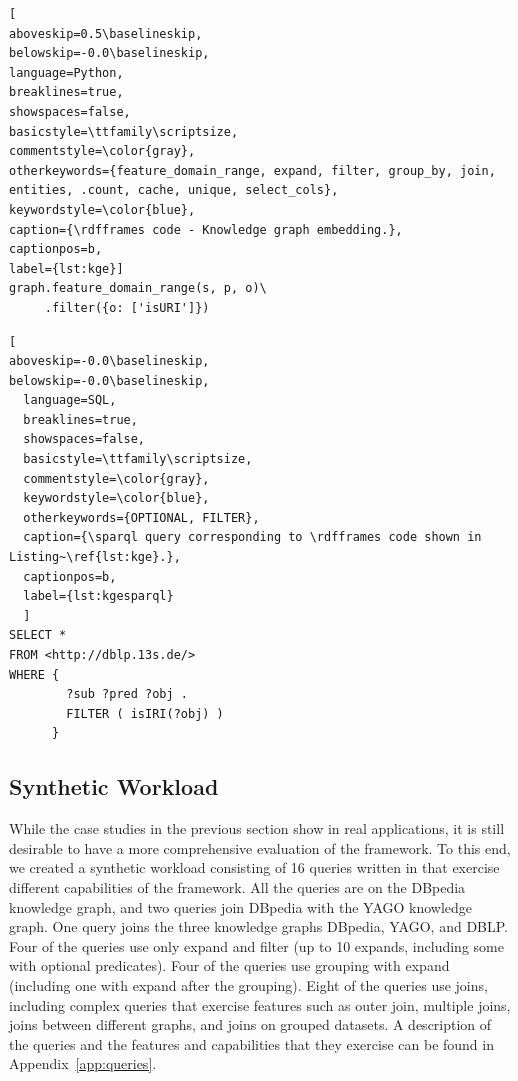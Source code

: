 \begin{lstlisting}[
aboveskip=0.5\baselineskip,
belowskip=-0.0\baselineskip,
language=Python,
breaklines=true,
showspaces=false,
basicstyle=\ttfamily\scriptsize,
commentstyle=\color{gray},
otherkeywords={feature_domain_range, expand, filter, group_by, join, entities, .count, cache, unique, select_cols},
keywordstyle=\color{blue},
caption={\rdfframes code - Knowledge graph embedding.},
captionpos=b,
label={lst:kge}]
graph.feature_domain_range(s, p, o)\
     .filter({o: ['isURI']})
\end{lstlisting}

\begin{lstlisting}[
aboveskip=-0.0\baselineskip,
belowskip=-0.0\baselineskip,
  language=SQL,
  breaklines=true,
  showspaces=false,
  basicstyle=\ttfamily\scriptsize,
  commentstyle=\color{gray},
  keywordstyle=\color{blue},
  otherkeywords={OPTIONAL, FILTER},
  caption={\sparql query corresponding to \rdfframes code shown in Listing~\ref{lst:kge}.},
  captionpos=b,
  label={lst:kgesparql}
  ]
SELECT * 
FROM <http://dblp.13s.de/>
WHERE {
        ?sub ?pred ?obj .
        FILTER ( isIRI(?obj) ) 
      }
\end{lstlisting}

\vspace*{-6pt}
\subsection{Synthetic Workload}
\label{subsec:sythetic}

\vspace*{-3pt}
While the case studies in the previous section show \rdfframes in real applications,
it is still desirable to have a more comprehensive evaluation of the framework.
To this end, we created a synthetic workload
consisting of 16 queries
written in \rdfframes that exercise different capabilities of the framework.
All the queries are on the DBpedia knowledge graph, and two queries join DBpedia with the YAGO knowledge graph.
One query joins the three knowledge graphs DBpedia, YAGO, and DBLP.
Four of the queries use only expand and filter (up to 10 expands, including some with optional predicates).
Four of the queries use grouping with expand (including one with expand after the grouping).
Eight of the queries use joins, including complex queries that exercise features such as outer join, multiple joins, joins between different graphs, and joins on grouped datasets.
A description of the  queries and the \rdfframes features and \sparql capabilities that they exercise
can be found in Appendix~\ref{app:queries}.

